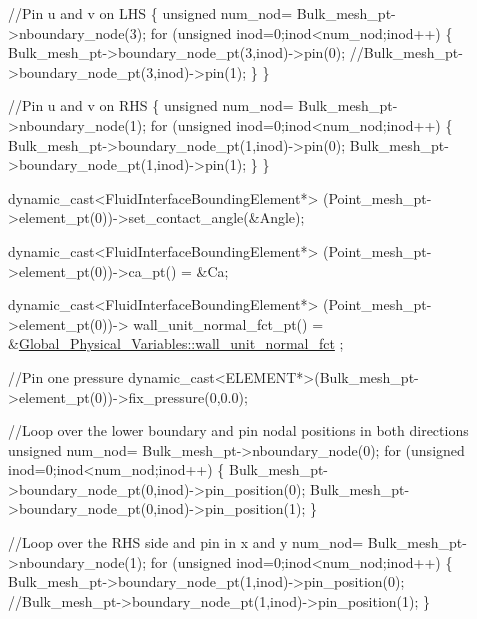 \begin{DoxyCodeInclude}
  \textcolor{comment}{//Pin u and v on LHS}
  \{
   \textcolor{keywordtype}{unsigned} num\_nod= Bulk\_mesh\_pt->nboundary\_node(3);
   \textcolor{keywordflow}{for} (\textcolor{keywordtype}{unsigned} inod=0;inod<num\_nod;inod++)
    \{
     Bulk\_mesh\_pt->boundary\_node\_pt(3,inod)->pin(0);
     \textcolor{comment}{//Bulk\_mesh\_pt->boundary\_node\_pt(3,inod)->pin(1);}
    \}
  \}
  
  \textcolor{comment}{//Pin u and v on RHS}
  \{
   \textcolor{keywordtype}{unsigned} num\_nod= Bulk\_mesh\_pt->nboundary\_node(1);
   \textcolor{keywordflow}{for} (\textcolor{keywordtype}{unsigned} inod=0;inod<num\_nod;inod++)
    \{
     Bulk\_mesh\_pt->boundary\_node\_pt(1,inod)->pin(0);
     Bulk\_mesh\_pt->boundary\_node\_pt(1,inod)->pin(1);
    \}
  \}

  
  \textcolor{keyword}{dynamic\_cast<}FluidInterfaceBoundingElement*\textcolor{keyword}{>}
   (Point\_mesh\_pt->element\_pt(0))->set\_contact\_angle(&Angle);

  \textcolor{keyword}{dynamic\_cast<}FluidInterfaceBoundingElement*\textcolor{keyword}{>}
   (Point\_mesh\_pt->element\_pt(0))->ca\_pt() = &Ca;

  
  \textcolor{keyword}{dynamic\_cast<}FluidInterfaceBoundingElement*\textcolor{keyword}{>}
   (Point\_mesh\_pt->element\_pt(0))->
   wall\_unit\_normal\_fct\_pt() = &\hyperlink{namespaceGlobal__Physical__Variables_a0d48e8726fa485de2b2df2d5031ec41b}{Global\_Physical\_Variables::wall\_unit\_normal\_fct}
      ;

  \textcolor{comment}{//Pin one pressure}
  \textcolor{keyword}{dynamic\_cast<}ELEMENT*\textcolor{keyword}{>}(Bulk\_mesh\_pt->element\_pt(0))->fix\_pressure(0,0.0);

  \textcolor{comment}{//Loop over the lower boundary and pin nodal positions in both directions}
  \textcolor{keywordtype}{unsigned} num\_nod= Bulk\_mesh\_pt->nboundary\_node(0);
  \textcolor{keywordflow}{for} (\textcolor{keywordtype}{unsigned} inod=0;inod<num\_nod;inod++)
   \{
    Bulk\_mesh\_pt->boundary\_node\_pt(0,inod)->pin\_position(0);
    Bulk\_mesh\_pt->boundary\_node\_pt(0,inod)->pin\_position(1);
   \}
  
  \textcolor{comment}{//Loop over the RHS side and pin in x and y}
  num\_nod= Bulk\_mesh\_pt->nboundary\_node(1);
  \textcolor{keywordflow}{for} (\textcolor{keywordtype}{unsigned} inod=0;inod<num\_nod;inod++)
   \{
    Bulk\_mesh\_pt->boundary\_node\_pt(1,inod)->pin\_position(0);
    \textcolor{comment}{//Bulk\_mesh\_pt->boundary\_node\_pt(1,inod)->pin\_position(1);}
  \}
  

\end{DoxyCodeInclude}
